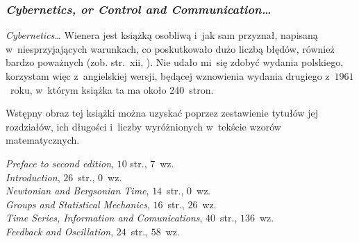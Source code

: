 \documentclass[10pt,t]{beamer}
\begin{document}
\begin{frame}
  \frametitle{\textit{Cybernetics, or Control and
      Communication\ldots}}


  \textit{Cybernetics\ldots} Wienera jest książką osobliwą i~jak sam przyznał,
  napisaną w~niesprzyjających warunkach, co poskutkowało dużo liczbą błędów,
  również bardzo poważnych (zob. str.~xii,
  \parencite{Wiener-Cybernetics-Second-edition-Pub-2016}). Nie udało mi~się
  zdobyć wydania polskiego, korzystam więc z~angielskiej wersji, będącej
  wznowienia wydania drugiego z~$1961$~roku, w~którym książka ta ma około
  $240$~stron.

  Wstępny obraz tej książki można uzyskać poprzez zestawienie tytułów jej
  rozdziałów, ich długości i~liczby wyróżnionych w~tekście wzorów
  matematycznych.

  \textit{Preface to second edition}, $10$ str., $7$~wz. \\
  \textit{Introduction}, $26$~str., $0$~wz. \\
  \textit{Newtonian and Bergsonian Time}, $14$~str., $0$~wz. \\
  \textit{Groups and Statistical Mechanics}, $16$~str., $26$~wz. \\
  \textit{Time Series, Information and Comunications}, $40$~str.,
  $136$~wz. \\
  \textit{Feedback and Oscillation}, $24$~str., $58$~wz. \\

\end{frame}
\end{document}
